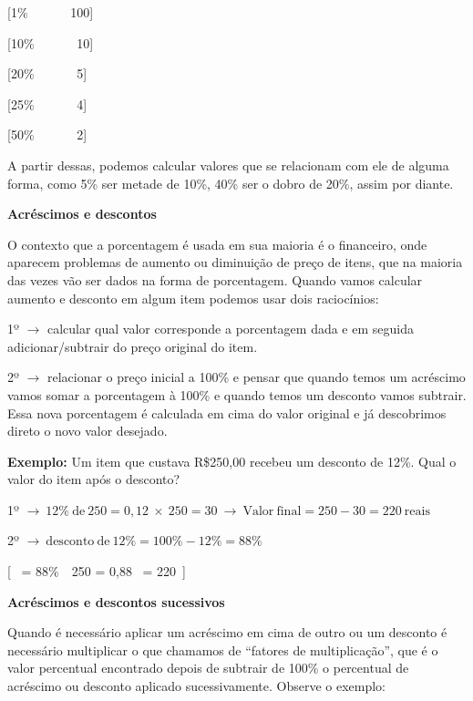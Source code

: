 [1\%\ \ \  \rightarrow {}\ \ \ 100]

[10\%\ \ \  \rightarrow {}\ \ \ 10]

[20\%\ \ \  \rightarrow {}\ \ \ 5]

[25\%\ \ \  \rightarrow {}\ \ \ 4]

[50\%\ \ \  \rightarrow {}\ \ \ 2]

A partir dessas, podemos calcular valores que se relacionam com ele de
alguma forma, como 5\% ser metade de 10\%, 40\% ser o dobro de 20\%,
assim por diante.

\textbf{Acréscimos e descontos}

O contexto que a porcentagem é usada em sua maioria é o financeiro, onde
aparecem problemas de aumento ou diminuição de preço de itens, que na
maioria das vezes vão ser dados na forma de porcentagem. Quando vamos
calcular aumento e desconto em algum item podemos usar dois raciocínios:

1º \(\rightarrow\) calcular qual valor corresponde a porcentagem dada e
em seguida adicionar/subtrair do preço original do item.

2º \(\rightarrow\) relacionar o preço inicial a 100\% e pensar que
quando temos um acréscimo vamos somar a porcentagem à 100\% e quando
temos um desconto vamos subtrair. Essa nova porcentagem é calculada em
cima do valor original e já descobrimos direto o novo valor desejado.

\textbf{Exemplo:} Um item que custava R\$250,00 recebeu um desconto de
12\%. Qual o valor do item após o desconto?

1º
\(\rightarrow \ 12\%\ \text{de}\ 250 = 0,12\  \times \ 250 = 30\  \rightarrow \ \text{Valor}\ \text{final} = 250 - 30 = 220\ \text{reais}\)

2º
\(\rightarrow \ \text{desconto}\ \text{de}\ 12\% = 100\% - 12\% = 88\%\)

[\text{\ \ \ \ \ \ \ }\  = 88\%\ \ 250 = 0,88\   = 220\ ]

\textbf{Acréscimos e descontos sucessivos}

Quando é necessário aplicar um acréscimo em cima de outro ou um desconto
é necessário multiplicar o que chamamos de ``fatores de multiplicação'',
que é o valor percentual encontrado depois de subtrair de 100\% o
percentual de acréscimo ou desconto aplicado sucessivamente. Observe o
exemplo:

